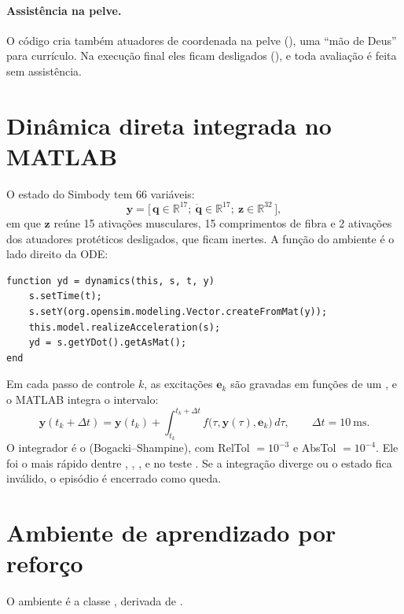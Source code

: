 \documentclass[11pt,a4paper]{article}
\begin{document}
\paragraph{Assistência na pelve.} O código cria também atuadores de coordenada na pelve (),
uma ``mão de Deus'' para currículo. Na execução final eles ficam desligados (),
e toda avaliação é feita sem assistência.

\section{Dinâmica direta integrada no MATLAB}
O estado do Simbody tem 66 variáveis:
\begin{equation}
\mathbf y = \big[\,\mathbf q\in\mathbb R^{17};\ \dot{\mathbf q}\in\mathbb R^{17};\ \mathbf z\in\mathbb R^{32}\,\big],
\end{equation}
em que $\mathbf z$ reúne 15 ativações musculares, 15 comprimentos de fibra e 2 ativações dos atuadores
protéticos desligados, que ficam inertes. A função  do ambiente é o lado direito da ODE:
\begin{lstlisting}[firstnumber=238]
function yd = dynamics(this, s, t, y)
    s.setTime(t);
    s.setY(org.opensim.modeling.Vector.createFromMat(y));
    this.model.realizeAcceleration(s);
    yd = s.getYDot().getAsMat();
end
\end{lstlisting}
Em cada passo de controle $k$, as excitações $\mathbf e_k$ são gravadas em funções  de um
, e o MATLAB integra o intervalo:
\begin{equation}
\mathbf y(t_k+\Delta t) = \mathbf y(t_k) + \int_{t_k}^{t_k+\Delta t} f\big(\tau,\mathbf y(\tau),\mathbf e_k\big)\,d\tau,
\qquad \Delta t = 10~\text{ms}.
\end{equation}
O integrador é o  (Bogacki--Shampine), com RelTol $=10^{-3}$ e AbsTol $=10^{-4}$. Ele foi o mais
rápido dentre , , ,  e  no teste
. Se a integração diverge ou o estado fica inválido, o episódio é encerrado como queda.

\section{Ambiente de aprendizado por reforço}
O ambiente é a classe , derivada de .
\end{document}

